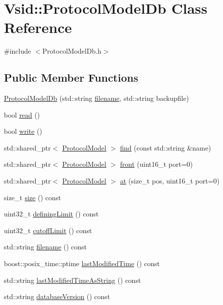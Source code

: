 \hypertarget{class_vsid_1_1_protocol_model_db}{\section{Vsid\-:\-:Protocol\-Model\-Db Class Reference}
\label{class_vsid_1_1_protocol_model_db}
}


{\ttfamily \#include $<$Protocol\-Model\-Db.\-h$>$}

\subsection*{Public Member Functions}
\begin{DoxyCompactItemize}
\item 
\hyperlink{class_vsid_1_1_protocol_model_db_a5add89591932a7851cca9df71e9c2873}{Protocol\-Model\-Db} (std\-::string \hyperlink{class_vsid_1_1_protocol_model_db_ae4c2e7652218bb11f10bf0d4d0d0257d}{filename}, std\-::string backupfile)
\item 
bool \hyperlink{class_vsid_1_1_protocol_model_db_ab4cdbc95950371528dea8adbc39fccef}{read} ()
\item 
bool \hyperlink{class_vsid_1_1_protocol_model_db_a6555ccdf11081b5e255ee3b8d17a7ea8}{write} ()
\item 
std\-::shared\-\_\-ptr$<$ \hyperlink{class_vsid_1_1_protocol_model}{Protocol\-Model} $>$ \hyperlink{class_vsid_1_1_protocol_model_db_a542f3434c2a9d97ee2632200372a6a88}{find} (const std\-::string \&name)
\item 
std\-::shared\-\_\-ptr$<$ \hyperlink{class_vsid_1_1_protocol_model}{Protocol\-Model} $>$ \hyperlink{class_vsid_1_1_protocol_model_db_a4209a57665d19cc6abf920a5cfb0500c}{front} (uint16\-\_\-t port=0)
\item 
std\-::shared\-\_\-ptr$<$ \hyperlink{class_vsid_1_1_protocol_model}{Protocol\-Model} $>$ \hyperlink{class_vsid_1_1_protocol_model_db_a5bc72492cdde09f1bf753e0ebee26e9e}{at} (size\-\_\-t pos, uint16\-\_\-t port=0)
\item 
size\-\_\-t \hyperlink{class_vsid_1_1_protocol_model_db_a83473d93ae3503810ce0b2ed3de19836}{size} () const 
\item 
uint32\-\_\-t \hyperlink{class_vsid_1_1_protocol_model_db_a511e5fdf67995099e81175a6d34d1aac}{defining\-Limit} () const 
\item 
uint32\-\_\-t \hyperlink{class_vsid_1_1_protocol_model_db_a2df8e380ce56c8509007df98fce27d09}{cutoff\-Limit} () const 
\item 
std\-::string \hyperlink{class_vsid_1_1_protocol_model_db_ae4c2e7652218bb11f10bf0d4d0d0257d}{filename} () const 
\item 
boost\-::posix\-\_\-time\-::ptime \hyperlink{class_vsid_1_1_protocol_model_db_ab7111a24bbb1c4eb6fb1a2ea61dbcaa6}{last\-Modified\-Time} () const 
\item 
std\-::string \hyperlink{class_vsid_1_1_protocol_model_db_a277630c01a8dc5a95ec5ded8e1e68197}{last\-Modified\-Time\-As\-String} () const 
\item 
std\-::string \hyperlink{class_vsid_1_1_protocol_model_db_a9c185b6df9f6f41baa1500251c7b723b}{database\-Version} () const 
\end{DoxyCompactItemize}


